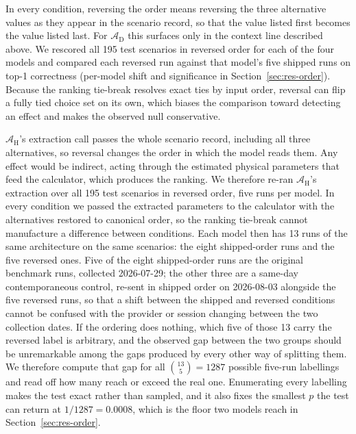 \documentclass[final,3p,times]{elsarticle}
\begin{document}
In every condition, reversing the order means reversing the three alternative values as they appear in the scenario record, so that the value listed first becomes the value listed last. For $\mathcal{A}_{\text{D}}$ this surfaces only in the context line described above. We rescored all 195 test scenarios in reversed order for each of the four models and compared each reversed run against that model's five shipped runs on top-1 correctness (per-model shift and significance in Section~\ref{sec:res-order}). Because the ranking tie-break resolves exact ties by input order, reversal can flip a fully tied choice set on its own, which biases the comparison toward detecting an effect and makes the observed null conservative.

$\mathcal{A}_{\text{H}}$'s extraction call passes the whole scenario record, including all three alternatives, so reversal changes the order in which the model reads them. Any effect would be indirect, acting through the estimated physical parameters that feed the calculator, which produces the ranking. We therefore re-ran $\mathcal{A}_{\text{H}}$'s extraction over all 195 test scenarios in reversed order, five runs per model. In every condition we passed the extracted parameters to the calculator with the alternatives restored to canonical order, so the ranking tie-break cannot manufacture a difference between conditions. Each model then has 13 runs of the same architecture on the same scenarios: the eight shipped-order runs and the five reversed ones. Five of the eight shipped-order runs are the original benchmark runs, collected 2026-07-29; the other three are a same-day contemporaneous control, re-sent in shipped order on 2026-08-03 alongside the five reversed runs, so that a shift between the shipped and reversed conditions cannot be confused with the provider or session changing between the two collection dates. If the ordering does nothing, which five of those 13 carry the reversed label is arbitrary, and the observed gap between the two groups should be unremarkable among the gaps produced by every other way of splitting them. We therefore compute that gap for all $\binom{13}{5} = 1287$ possible five-run labellings and read off how many reach or exceed the real one. Enumerating every labelling makes the test exact rather than sampled, and it also fixes the smallest $p$ the test can return at $1/1287 = 0.0008$, which is the floor two models reach in Section~\ref{sec:res-order}.

\FloatBarrier
\end{document}
